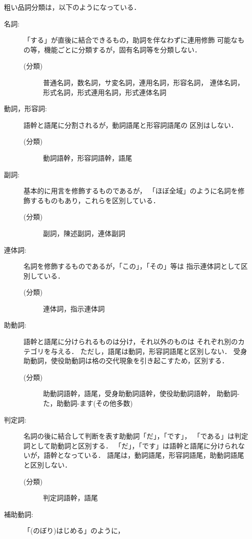 粗い品詞分類は，以下のようになっている．
\begin{description}
\item[名詞: ] 「する」が直後に結合できるもの，助詞を伴なわずに連用修飾
  可能なもの等，機能ごとに分類するが，固有名詞等を分類しない．
  \begin{description}
  \item[(分類)] 普通名詞，数名詞，サ変名詞，連用名詞，形容名詞，
    連体名詞，形式名詞，形式連用名詞，形式連体名詞
  \end{description}
\item[動詞，形容詞: ] 語幹と語尾に分割されるが，動詞語尾と形容詞語尾の
  区別はしない．
  \begin{description}
  \item[(分類)] 動詞語幹，形容詞語幹，語尾
  \end{description}
\item[副詞: ] 基本的に用言を修飾するものであるが，
  「ほぼ全域」のように名詞を修飾するものもあり，これらを区別している．
  \begin{description}
  \item[(分類)] 副詞，陳述副詞，連体副詞
  \end{description}
\item[連体詞: ] 名詞を修飾するものであるが，「この」，「その」等は
  指示連体詞として区別している．
  \begin{description}
  \item[(分類)] 連体詞，指示連体詞
  \end{description}
\item[助動詞: ] 語幹と語尾に分けられるものは分け，それ以外のものは
  それぞれ別のカテゴリを与える．
  ただし，語尾は動詞，形容詞語尾と区別しない．
  受身助動詞，使役助動詞は格の交代現象を引き起こすため，区別する．
  \begin{description}
  \item[(分類)] 助動詞語幹，語尾，受身助動詞語幹，使役助動詞語幹，
    助動詞-た，助動詞-ます(その他多数)
  \end{description}
\item[判定詞: ] 名詞の後に結合して判断を表す助動詞「だ」，「です」，
  「である」は判定詞として助動詞と区別する．
  「だ」，「です」は語幹と語尾に分けられないが，語幹となっている．
  語尾は，動詞語尾，形容詞語尾，助動詞語尾と区別しない．
  \begin{description}
  \item[(分類)] 判定詞語幹，語尾
  \end{description}
\item[補助動詞: ] 「(のぼり)はじめる」のように，

\end{description}
